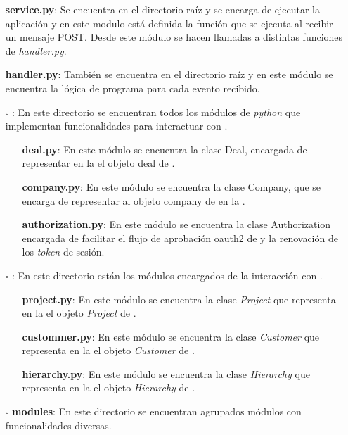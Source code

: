 \begin{itemize}

	\item [\textendash] \textbf{service.py}: Se encuentra en el directorio raíz y se encarga de ejecutar la aplicación 
	y en este modulo está definida la función que se ejecuta al recibir un mensaje POST. Desde este módulo se hacen llamadas a distintas funciones de \textit{handler.py}.
	\item [\textendash] \textbf{handler.py}: También se encuentra en el directorio raíz y en este módulo se encuentra la lógica de programa para cada evento recibido.
	\item[$\square$] \textbf{\hs{}}: En este directorio se encuentran todos los módulos de \textit{python} que implementan funcionalidades para interactuar con \hs.
	
		\begin{itemize}
			\item [\textendash] \textbf{deal.py}: En este módulo se encuentra la clase Deal, encargada de representar en la \iface{} el objeto deal de \hs.
			\item [\textendash] \textbf{company.py}: En este módulo se encuentra la clase Company, que se encarga de representar al objeto company de \hs{} en la \iface.
			\item [\textendash] \textbf{authorization.py}: En este módulo se encuentra la clase Authorization encargada de facilitar el flujo de aprobación \gls{oauth2} de \hs{} y la renovación de los \textit{token} de sesión.
		\end{itemize}
		
	\item[$\square$] \textbf{\wday{}}: En este directorio están los módulos encargados de la interacción con \wday.
	
		\begin{itemize}
			\item [\textendash] \textbf{project.py}: En este módulo se encuentra la clase \textit{Project} que representa en la \iface{} el objeto \textit{Project} de \wday.
			\item [\textendash] \textbf{custommer.py}: En este módulo se encuentra la clase \textit{Customer} que representa en la \iface{} el objeto \textit{Customer} de \wday.
			\item [\textendash] \textbf{hierarchy.py}: En este módulo se encuentra la clase \textit{Hierarchy} que representa en la \iface{} el objeto \textit{Hierarchy} de \wday.
		\end{itemize}
	\item[$\square$] \textbf{modules}: En este directorio se encuentran agrupados módulos con funcionalidades diversas. 
	

\end{itemize}
